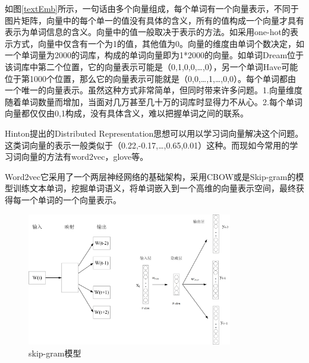 如图\ref{textEmb}所示，一句话由多个向量组成，每个单词有一个向量表示，不同于图片矩阵，向量中的每个单一的值没有具体的含义，所有的值构成一个向量才具有表示为单词信息的含义。向量中的值一般取决于表示的方法。如采用one-hot的表示方式，向量中仅含有一个为1的值，其他值为0。向量的维度由单词个数决定，如一个单词量为2000的词库，构成的单词向量即为1*2000的向量。如单词Dream位于该词库中第二个位置，它的向量表示可能是（0,1,0,0,…,0），另一个单词Have可能位于第1000个位置，那么它的向量表示可能就是（0,0,…,1,…,0,0）。每个单词都由一个唯一的向量表示。虽然这种方式非常简单，但同时带来许多问题。1.向量维度随着单词数量而增加，当面对几万甚至几十万的词库时显得力不从心。2.每个单词向量都仅仅由0,1构成，没有具体含义，难以把握单词之间的联系。

Hinton提出的Distributed Representation思想可以用以学习词向量解决这个问题。这类词向量的表示一般类似于（0.22,-0.17,…,0.65,0.01）这种。而现如今常用的学习词向量的方法有word2vec，glove等。

Word2vec它采用了一个两层神经网络的基础架构，采用CBOW或是Skip-gram的模型训练文本单词，挖掘单词语义，将单词嵌入到一个高维的向量表示空间，最终获得每一个单词的一个向量表示。
\begin{figure}[htb]%
	\setlength{\belowcaptionskip}{0pt}
	\centering
	\includegraphics[width=0.8\textwidth]{pic/2-4.png}
	\caption{skip-gram模型}
	\label{skip-gram}
\end{figure}

